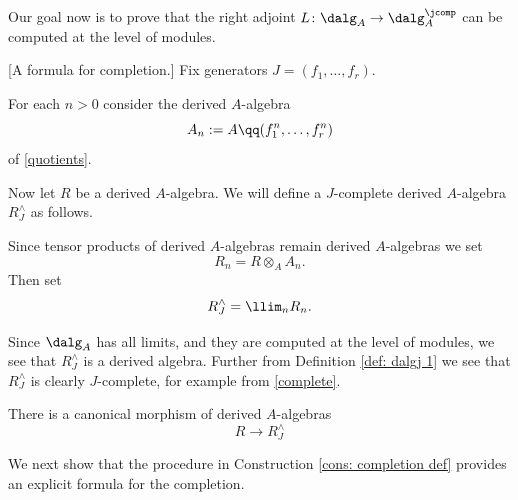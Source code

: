 \documentclass[10pt,reqno]{amsart}
\numberwithin{equation}{section}
\begin{document}
Our goal now is to prove that the right adjoint $L\colon \dalg_A\to \dalg_A^\jcomp$ can be computed at the level of modules. 


\begin{construction}\label{cons: completion def}[A formula for completion.]
Fix generators $J=(f_1,\ldots, f_r).$

For each $n>0$ consider the derived $A$-algebra $$A_n:=A\qq(f_1^n,\ldots, f_r^n)$$ of \ref{quotients}.

Now let $R$ be a derived $A$-algebra. We will define a $J$-complete derived $A$-algebra $R^\wedge_J$ as follows. 

Since tensor products of derived $A$-algebras remain derived $A$-algebras we set $$R_n=R\otimes_A A_n.$$
Then set
\begin{equation}\label{eq: completion def}
    R^\wedge_J=\llim_n R_n.
\end{equation}

Since $\dalg_A$ has all limits, and they are computed at the level of modules, we see that $R^\wedge_J$ is a derived algebra. Further from Definition \ref{def: dalgj 1} we see that $R^\wedge_J$ is clearly $J$-complete, for example from \ref{complete}.

There is a canonical morphism of derived $A$-algebras
\begin{equation}\label{eq: can map to for completion}
  R\to  R^\wedge_J  
\end{equation}


\end{construction}

We next show that the procedure in Construction \ref{cons: completion def} provides an explicit formula for the completion.
\end{document}
